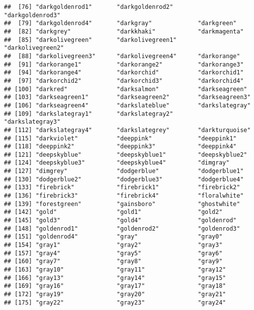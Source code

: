 \documentclass[
]{article}
\begin{document}
\begin{verbatim}
##  [76] "darkgoldenrod1"       "darkgoldenrod2"       "darkgoldenrod3"      
##  [79] "darkgoldenrod4"       "darkgray"             "darkgreen"           
##  [82] "darkgrey"             "darkkhaki"            "darkmagenta"         
##  [85] "darkolivegreen"       "darkolivegreen1"      "darkolivegreen2"     
##  [88] "darkolivegreen3"      "darkolivegreen4"      "darkorange"          
##  [91] "darkorange1"          "darkorange2"          "darkorange3"         
##  [94] "darkorange4"          "darkorchid"           "darkorchid1"         
##  [97] "darkorchid2"          "darkorchid3"          "darkorchid4"         
## [100] "darkred"              "darksalmon"           "darkseagreen"        
## [103] "darkseagreen1"        "darkseagreen2"        "darkseagreen3"       
## [106] "darkseagreen4"        "darkslateblue"        "darkslategray"       
## [109] "darkslategray1"       "darkslategray2"       "darkslategray3"      
## [112] "darkslategray4"       "darkslategrey"        "darkturquoise"       
## [115] "darkviolet"           "deeppink"             "deeppink1"           
## [118] "deeppink2"            "deeppink3"            "deeppink4"           
## [121] "deepskyblue"          "deepskyblue1"         "deepskyblue2"        
## [124] "deepskyblue3"         "deepskyblue4"         "dimgray"             
## [127] "dimgrey"              "dodgerblue"           "dodgerblue1"         
## [130] "dodgerblue2"          "dodgerblue3"          "dodgerblue4"         
## [133] "firebrick"            "firebrick1"           "firebrick2"          
## [136] "firebrick3"           "firebrick4"           "floralwhite"         
## [139] "forestgreen"          "gainsboro"            "ghostwhite"          
## [142] "gold"                 "gold1"                "gold2"               
## [145] "gold3"                "gold4"                "goldenrod"           
## [148] "goldenrod1"           "goldenrod2"           "goldenrod3"          
## [151] "goldenrod4"           "gray"                 "gray0"               
## [154] "gray1"                "gray2"                "gray3"               
## [157] "gray4"                "gray5"                "gray6"               
## [160] "gray7"                "gray8"                "gray9"               
## [163] "gray10"               "gray11"               "gray12"              
## [166] "gray13"               "gray14"               "gray15"              
## [169] "gray16"               "gray17"               "gray18"              
## [172] "gray19"               "gray20"               "gray21"              
## [175] "gray22"               "gray23"               "gray24"              

\end{verbatim}
\end{document}
